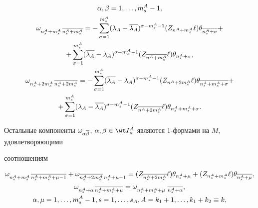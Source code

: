 \begin{gather}
%


\alpha, \beta =1,\dotsc,m^A_s-1,\notag \\


%


\omega_{n^A_s+m^A_s \, \ol{n^A_s+m^A_s}} =


- \sum\limits^{m^A_s}_{\sigma=1}


(\lambda_A - \ol{\lambda_A})^{\sigma-m^A_s-1}


(Z_{n^A+ m^A_s} \ell) \theta_{\ol{n^A_s+\sigma}}+\notag \\


\label{2s2-44}


+\sum\limits^{m^A_s}_{\sigma=1}


(\ol{\lambda_A} - \lambda_A)^{\sigma-m^A_s-1}


(Z_{\ol{n^A+ m^A_s}} \ell) \theta_{n^A_s+\sigma},\\


%


\omega_{n^A_s+2m^A_s \, \ol{n^A_s+2m^A_s}} =


- \sum\limits^{m^A_s}_{\sigma=1}


(\ol{\lambda_A} - \lambda_A)^{\sigma-m^A_s-1}


(Z_{n^A+ 2m^A_s} \ell) \theta_{\ol{n^A_s+m^A_s+\sigma}}+\notag \\


%


\label{2s2-45}


+\sum\limits^{m^A_s}_{\sigma=1}


(\lambda_A - \ol{\lambda_A})^{\sigma-m^A_s-1}


(Z_{\ol{n^A+ 2m^A_s}} \ell) \theta_{n^A_s+m^A_s+\sigma}.


\end{gather}


Остальные компоненты $\omega_{\alpha\ol\beta}$, $\alpha,\beta\in


{\wt I}{}^A_s$ являются 1-формами на $M$, удовлетворяющими


соотношениям


\begin{gather}


\label{2s2-39}


\omega_{n^A_s+m^A_s\, \ol{n^A_s+m^A_s+\mu-1}} +


\omega_{\ol{n^A_s+2m^A_s}\, n^A_s+\mu-1} =


(Z_{\ol{n^A_s+2m^A_s}}\ell) \theta_{n^A_s+\mu} + (Z_{n^A_s+m^A_s}\ell)


\theta_{\ol{n^A_s+\mu}},\\


%


\label{2s2-40}


\omega_{n^A_s+\alpha\, \ol{n^A_s+m^A_s+\mu}} = \omega_{n^A_s+m^A_s+\mu\


\ol{n^A_s+\alpha}},\\


%


\alpha, \mu =1,\dotsc,m^A_s-1, s=1,\dotsc,s_A,


A=k_1+1,\dotsc,k_1+k_2\equiv k,\notag


\end{gather}


